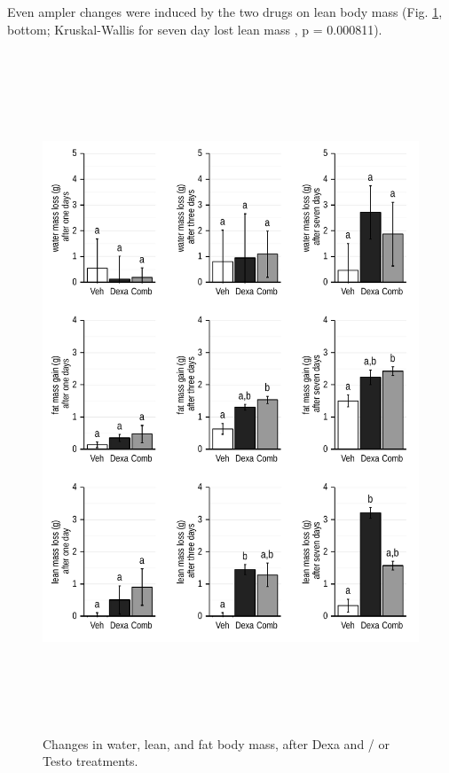 \documentclass[12pt,english]{report}\usepackage[]{graphicx}\usepackage[]{color}
\newenvironment{knitrout}{}{} %
\begin{document}
Even ampler changes were induced by the two drugs on lean body mass
(Fig. \ref{fig:Changes-in-water,}, bottom; Kruskal-Wallis for seven
day lost lean mass , p = 0.000811).

\begin{figure}
\begin{knitrout}
\color{fgcolor}
\includegraphics[width=6in,height=8in]{figure/unnamed-chunk-3-1} 

\end{knitrout}

\protect\caption{Changes in water, lean, and fat body mass, after Dexa and / or Testo
treatments.\label{fig:Changes-in-water,}}
\end{figure}
\pagebreak{}
\end{document}

